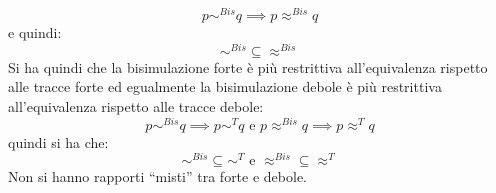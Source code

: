 \[p\sim^{Bis} q\implies p\approx^{Bis} q\]
e quindi:
\[\sim^{Bis} \subseteq \approx^{Bis}\]
Si ha quindi che la bisimulazione forte è più restrittiva all’equivalenza
rispetto alle tracce forte ed egualmente la bisimulazione debole è più
restrittiva all’equivalenza rispetto alle tracce debole:
\[p\sim^{Bis}q\implies p\sim^T q\mbox{ e }p\approx^{Bis}q\implies p\approx^Tq\]
quindi si ha che:
\[\sim^{Bis}\subseteq\sim^T \mbox{ e }\approx^{Bis}\subseteq\approx^T\]
Non si hanno rapporti ``misti'' tra forte e debole.\\
\begin{table}[H]
\centering
{}
\end{table}
